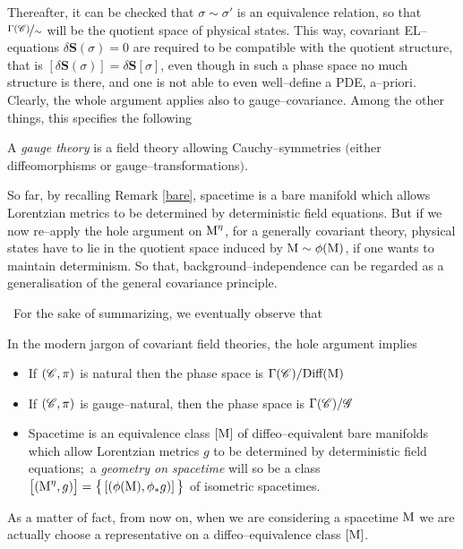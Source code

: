 Thereafter, it can be checked that $\sigma\sim\sigma'$ is an equivalence relation, so that $\nicefrac{\Gamma\left(\mathscr{C}\right)}{\sim}$ will be the quotient space of physical states. This way, covariant EL--equations $\delta\mathbf{S}(\sigma)=0$ are required to be compatible with the quotient structure, that is $\left[\delta\mathbf{S}(\sigma)\right]=\delta\mathbf{S}[\sigma]$, even though in such a phase space no much structure is there, and one is not able to even well--define a PDE, a--priori. Clearly, the whole argument applies also to gauge--covariance. Among the other things, this specifies the following


\begin{defi}\label{def_gauge_theory}
    A \emph{gauge theory} is a field theory allowing Cauchy--symmetries $($either diffeomorphisms or gauge--transformations$)$.
\end{defi}

So far, by recalling Remark \ref{bare}, spacetime is a bare manifold which allows Lorentzian metrics to be determined by deterministic field equations. But if we now re--apply the hole argument on $\text{\normalfont M}^\eta$, for a generally covariant theory, physical states have to lie in the quotient space induced by $\text{\normalfont M}\sim\phi(\text{\normalfont M})$, if one wants to maintain determinism. So that, background--independence can be regarded as a generalisation of the general covariance principle.

\,\newline
For the sake of summarizing, we eventually observe that
\,\newline
\begin{remark}\label{hole}
    In the modern jargon of covariant field theories, the hole argument implies
    \begin{itemize}
        \item If $(\mathscr{C},\pi)$ is natural then the phase space is $\Gamma(\mathscr{C})/{\text{\normalfont Diff}(\text{\normalfont M})}$
        \item If $(\mathscr{C},\pi)$ is gauge--natural, then the phase space is $\Gamma(\mathscr{C})/\mathscr{G}$ 
        \item Spacetime is an equivalence class $[\text{\normalfont M}]$ of diffeo--equivalent bare manifolds which allow Lorentzian metrics $g$ to be determined by deterministic field equations;\, a \emph{geometry on spacetime} will so be a class $\big[(\text{\normalfont M}^\eta,g)\big]=\big\{\left[(\phi(\text{\normalfont M}),\phi_*g)\right]\big\}$ of isometric spacetimes.
  
    \end{itemize}
\end{remark}
As a matter of fact, from now on, when we are considering a spacetime $\text{\normalfont M}$ we are actually choose a representative on a diffeo--equivalence class $[\text{\normalfont M}]$.


